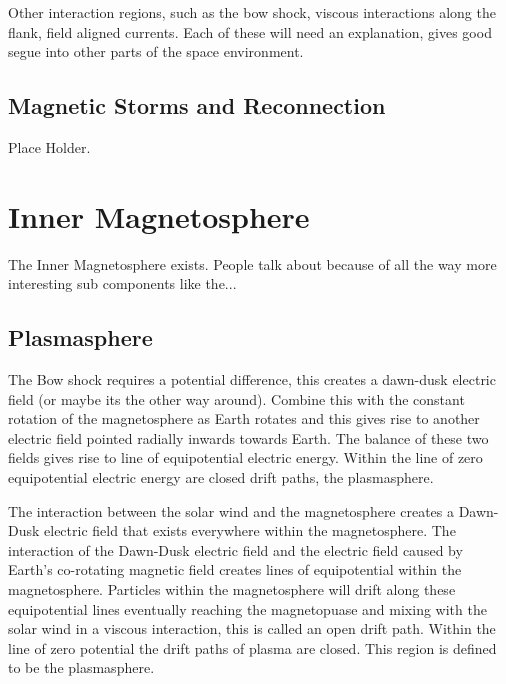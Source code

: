 \documentclass[utf8]{report}
\begin{document}
Other interaction regions, such as the bow shock, viscous interactions along the flank, field aligned currents. Each of these will need an explanation, gives good segue into other parts of the space environment. 
\subsection{Magnetic Storms and Reconnection}

Place Holder.

\section{Inner Magnetosphere}

The Inner Magnetosphere exists. People talk about because of all the way more interesting sub components like the...


\subsection{Plasmasphere}


 
 The Bow shock requires a potential difference, this creates a dawn-dusk electric field (or maybe its the other way around). Combine this with the constant rotation of the magnetosphere as Earth rotates and this gives rise to another electric field pointed radially inwards towards Earth. The balance of these two fields gives rise to line of equipotential electric energy. Within the line of zero equipotential electric energy are closed drift paths, the plasmasphere.

The interaction between the solar wind and the magnetosphere creates a Dawn-Dusk electric field that exists everywhere within the magnetosphere. The interaction of the Dawn-Dusk electric field and the electric field caused by Earth's co-rotating magnetic field creates lines of equipotential within the magnetosphere. Particles within the magnetosphere will drift along these equipotential lines eventually reaching the magnetopuase and mixing with the solar wind in a viscous interaction, this is called an open drift path. Within the line of zero potential the drift paths of plasma are closed. This region is defined to be the plasmasphere.
\end{document}
